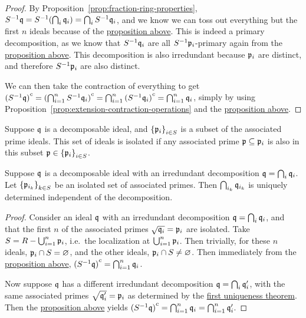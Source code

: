 \begin{proof}
    By Proposition~\ref{prop:fraction-ring-properties},
    \(S^{-1}\mfk{q} = S^{-1}\pqty{\bigcap_i \mfk{q}_i} = \bigcap_i S^{-1}\mfk{q}_i\),
    and we know we can toss out everything but the first \(n\) ideals
    because of the \hyperref[prop:fraction-primary]{proposition above}.
    This is indeed a primary decomposition,
    as we know that \(S^{-1}\mathfrak{q}_i\) are all \(S^{-1}\mathfrak{p}_i\)-primary
    again from the \hyperref[prop:fraction-primary]{proposition above}.
    This decomposition is also irredundant because \(\mathfrak{p}_i\) are distinct,
    and therefore \(S^{-1}\mathfrak{p}_i\) are also distinct.

    We can then take the contraction of everything to get
    \({(S^{-1}\mathfrak{q})}^c = {(\bigcap_{i=1}^n S^{-1}\mathfrak{q}_i)}^c
    = \bigcap_{i=1}^n {(S^{-1}\mathfrak{q}_i)}^c = \bigcap_{i=1}^n \mathfrak{q}_i\),
    simply by using Proposition~\ref{prop:extension-contraction-operations}
    and the \hyperref[prop:fraction-primary]{proposition above}.
\end{proof}
\begin{definition}
    Suppose \(\mathfrak{q}\) is a decomposable ideal,
    and \({\{\mathfrak{p}_i\}}_{i \in S}\) is a subset of the associated prime ideals.
    This set of ideals is isolated if any associated prime \(\mathfrak{p} \subseteq \mathfrak{p}_i\)
    is also in this subset \(\mathfrak{p} \in {\{\mathfrak{p}_i\}}_{i \in S}\).
\end{definition}
\begin{theorem}\label{thm:primary-uniqueness-2}
    Suppose \(\mathfrak{q}\) is a decomposable ideal with an irredundant decomposition \(\mathfrak{q} = \bigcap_i \mathfrak{q}_i\).
    Let \({\{\mathfrak{p}_{i_k}\}}_{k \in S}\) be an isolated set of associated primes.
    Then \(\bigcap_{i_k} \mathfrak{q}_{i_k}\) is uniquely determined independent of the decomposition.
\end{theorem}
\begin{proof}
    Consider an ideal \(\mathfrak{q}\)
    with an irredundant decomposition \(\mathfrak{q} = \bigcap_i \mathfrak{q}_i\),
    and that the first \(n\) of the associated primes \(\sqrt{\mathfrak{q}_i} = \mathfrak{p}_i\) are isolated.
    Take \(S = R - \bigcup_{i=1}^n \mathfrak{p}_i\),
    i.e.\ the localization at \(\bigcup_{i=1}^n \mathfrak{p}_i\).
    Then trivially, for these \(n\) ideals, \(\mathfrak{p}_i \cap S = \varnothing\),
    and the other ideals, \(\mathfrak{p}_i \cap S \neq \varnothing\).
    Then immediately from the \hyperref[prop:fraction-decomposition]{proposition above},
    \({(S^{-1}\mathfrak{q})}^c = \bigcap_{i=1}^n \mathfrak{q}_i\).
    
    Now suppose \(\mathfrak{q}\) has a different irredundant decomposition
    \(\mathfrak{q} = \bigcap_i \mathfrak{q}'_i\),
    with the same associated primes \(\sqrt{\mathfrak{q}'_i} = \mathfrak{p}_i\)
    as determined by the \hyperref[thm:primary-uniqueness-1]{first uniqueness theorem}.
    Then the \hyperref[prop:fraction-decomposition]{proposition above} yields
    \({(S^{-1}\mathfrak{q})}^c = \bigcap_{i=1}^n \mathfrak{q}_i = \bigcap_{i=1}^n \mathfrak{q}'_i\).
\end{proof}
